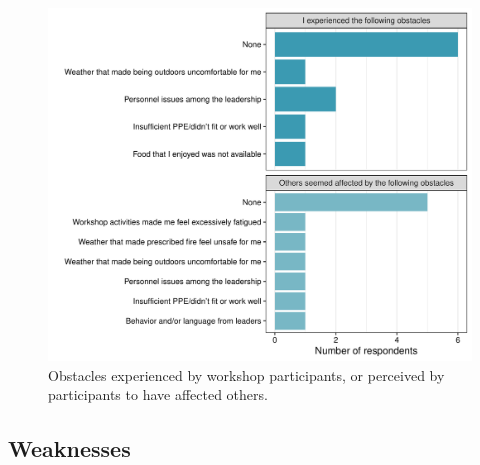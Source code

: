 \documentclass[fire,article,submit,moreauthors,pdftex]{Definitions/mdpi}
\begin{document}
\begin{figure}
\centering
\includegraphics[width=1\columnwidth]{obstacles_gg-1.pdf}
\caption{Obstacles experienced by workshop participants, or perceived by participants to have affected others. \label{obstacles}}
\end{figure}

\subsection{Weaknesses}
\end{document}
